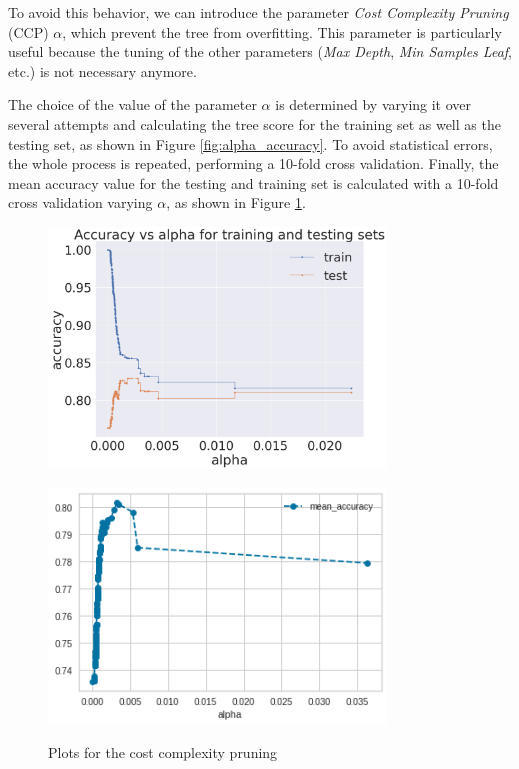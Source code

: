 \documentclass[a4paper,11pt,dvipsnames]{article}
\begin{document}
To avoid this behavior, we can introduce the parameter \textit{Cost Complexity Pruning} (CCP) $\alpha$, which prevent the tree from overfitting. This parameter is particularly useful because the tuning of the other parameters (\textit{Max Depth}, \textit{Min Samples Leaf}, etc.) is not necessary anymore.

The choice of the value of the parameter $\alpha$ is determined by varying it over several attempts and calculating the tree score for the training set as well as the testing set, as shown in Figure \ref{fig:alpha_accuracy}. To avoid statistical errors, the whole process is repeated, performing a 10-fold cross validation. Finally, the mean accuracy value for the testing and training set is calculated with a 10-fold cross validation varying $\alpha$, as shown in Figure \ref{fig:mean_accuracy}.

\begin{figure}[H]
\begin{minipage}{0.5\linewidth}
        \centering
    \includegraphics[width=0.8\textwidth]{accuracy_vs_alpha.png}
    \label{fig:alpha_accuracy}
\end{minipage}
\hfill
    \begin{minipage}{0.5\linewidth}
        \centering
    \includegraphics[width=0.8\textwidth]{mean_accuracy.png}
    \label{fig:mean_accuracy}
\end{minipage}
    \caption{Plots for the cost complexity pruning}
\end{figure}
\end{document}
